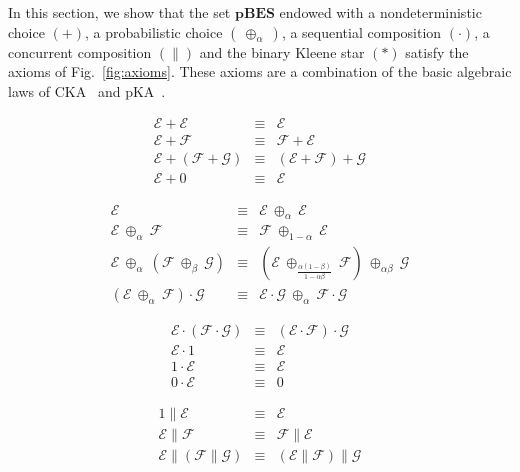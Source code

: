 \documentclass{llncs}
\newcommand{\pBES}{\mathbf{pBES}}
\newcommand{\EE}{\mathcal{E}}
\newcommand{\FF}{\mathcal{F}}
\newcommand{\G}{\mathcal{G}}
\newcommand{\<}{\langle}
\renewcommand{\>}{\rangle}
\newcommand{\pc}[1]{{\ \oplus_{\!#1}\ }}
\begin{document}
In this section, we show that the set  $\pBES$ endowed with a nondeterministic choice $(+)$, a probabilistic choice $(\!\pc{\alpha}\!)$, a sequential composition $(\cdot)$, a concurrent composition $(\|)$ and the binary Kleene star $(*)$ satisfy the axioms of Fig.~\ref{fig:axioms}. These axioms are a combination of the basic algebraic laws of CKA~\cite{Hoa09} and pKA~\cite{Mci05}. 
\begin{figure}
\hspace{-1cm}\begin{minipage}{.5\linewidth}
\begin{eqnarray}
\EE + \EE & \equiv & \EE\label{eq:+-idem}\\
\EE + \FF & \equiv & \FF + \EE \\
\EE + (\FF + \G) & \equiv & (\EE + \FF) + \G\label{eq:+-assoc}\\
\EE + 0 & \equiv & \EE \label{eq:+-zero}
\end{eqnarray}
\end{minipage}
\begin{minipage}{.57\linewidth}
\begin{eqnarray}
\EE & \equiv &\EE\pc{\alpha}\EE\label{eq:pc-idem}\\
\EE\pc{\alpha}\FF &\equiv & \FF\pc{1-\alpha}\EE\\
\EE\pc{\alpha}(\FF\pc{\beta}\G) &\equiv & (\EE\pc{\frac{\alpha(1-\beta)}{1-\alpha\beta}}\FF)\pc{\alpha\beta}\G\label{eq:pc-assoc}\\
(\EE\pc{\alpha}\FF)\cdot\G & \equiv & \EE\cdot\G\pc{\alpha}\FF\cdot\G
\end{eqnarray}
\end{minipage}

\hspace{-1cm}\begin{minipage}{.5\linewidth}
\begin{eqnarray}
\EE \cdot (\FF \cdot \G) & \equiv & (\EE \cdot \FF) \cdot \G\label{eq:cdot-assoc}\\
\EE\cdot 1 & \equiv & \EE\label{eq:rone}\\
1\cdot \EE & \equiv & \EE \label{eq:lone}\\
0\cdot\EE& \equiv & 0 \label{eq:seq-zero}
\end{eqnarray}
\end{minipage}
\begin{minipage}{.57\linewidth}
\begin{eqnarray}
1\|\EE &\equiv & \EE\label{eq:par-unit}\\
\EE\| \FF & \equiv & \FF\|\EE\label{eq:par-comm}\\
\EE \| (\FF \| \G) & \equiv & (\EE \| \FF) \| \G\label{eq:par-assoc}
\end{eqnarray}
\end{minipage}


\end{figure}
\end{document}
